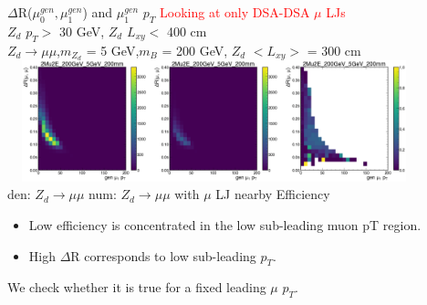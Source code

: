 \documentclass{beamer}
\begin{document}
\begin{frame}[t]{$\Delta$R($\mu^{gen}_0, \mu^{gen}_1$) and $\mu_1^{gen}$ $p_T$ }
\centering
\textcolor{red}{Looking at only DSA-DSA $\mu$ LJs}\\
 $Z_d$ $p_T>$ 30 GeV, $Z_d$ $L_{xy}<$ 400 cm\\
 \scriptsize
\textcolor{UniBlue}{$Z_d \rightarrow \mu\mu$},\textcolor{uvaorange}{$m_{Z_d}$ = 5 GeV,$m_B$ = 200 GeV, $Z_d$ $<L_{xy}>$ = 300 cm}\\
\centering
\includegraphics[width =12cm, height =3.5cm]{zd_mumu_genMu1_pt_dR_5_2dsa.png}\\
{\tiny \textcolor{uvaorange}{\hspace{-1cm}den: $Z_d\rightarrow\mu\mu$ \hspace{2.5cm } num: $Z_d\rightarrow\mu\mu$ with  $\mu$ LJ nearby\hspace{2cm} Efficiency\\}}

\normalsize
\begin{itemize}
\item Low efficiency is concentrated in the low sub-leading muon pT region.
     \vspace{1pt}
\item High $\Delta$R corresponds to low sub-leading $p_T$.
\end{itemize}
We check whether it is true for a fixed leading $\mu$ $p_T$.
\end{frame}
\end{document}

